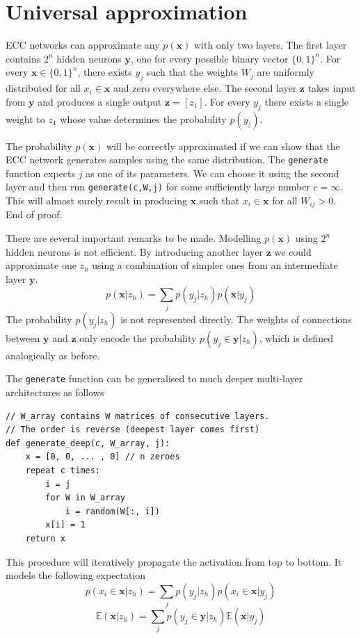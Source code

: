 \documentclass[12pt]{article}
\begin{document}
\section{Universal approximation}

ECC networks can approximate any $p(\boldsymbol{x})$ with only two layers. The first layer contains $2^n$ hidden neurons $\boldsymbol{y}$, one for every possible binary vector $\{0,1\}^n$. For every $\boldsymbol{x} \in \{0,1\}^n$, there exists $y_j$ such that the weights $W_j$ are uniformly distributed for all $x_i \in \boldsymbol{x}$ and zero everywhere else. The second layer $\boldsymbol{z}$ takes input from $\boldsymbol{y}$ and produces a single output $\boldsymbol{z}=[z_1]$. For every $y_j$ there exists a single weight to $z_1$ whose value determines the probability $p(y_j)$. 
 
The probability $p(\boldsymbol{x})$ will be correctly approximated if we can show that the ECC network generates samples using the same distribution. The \texttt{generate} function expects $j$ as one of its parameters. We can choose it using the second layer and then run \texttt{generate(c,W,j)} for some sufficiently large number $c=\infty$. This will almost surely result in producing  $\boldsymbol{x}$ such that $x_i\in \boldsymbol{x}$ for all $W_{ij}>0$. End of proof. 

There are several important remarks to be made. Modelling $p(\boldsymbol{x})$ using $2^n$ hidden neurons is not efficient. By introducing another layer $\boldsymbol{z}$ we could approximate one $z_h$ using a combination of  simpler ones from an intermediate layer $\boldsymbol{y}$.
\[
p(\boldsymbol{x}|z_h) = \sum_{j} p(y_j|z_h) p(\boldsymbol{x}|y_j)
\] 
The probability $p(y_j|z_h)$ is not represented directly. The weights of connections between $\boldsymbol{y}$ and $\boldsymbol{z}$ only encode the probability $p(y_j\in \boldsymbol{y}|z_h)$, which is defined analogically as before. 

The \texttt{generate} function can be generalised to much deeper multi-layer architectures as follows
\begin{lstlisting}
// W_array contains W matrices of consecutive layers.
// The order is reverse (deepest layer comes first)
def generate_deep(c, W_array, j):
    x = [0, 0, ... , 0] // n zeroes
    repeat c times:
        i = j
        for W in W_array
            i = random(W[:, i])
        x[i] = 1
    return x
\end{lstlisting}
This procedure will iteratively propagate the activation from top to bottom. It models the following expectation
\[
p(x_i\in \boldsymbol{x}|z_h) = \sum_{j} p(y_j|z_h) p(x_i \in \boldsymbol{x}|y_j)
\]
\[
\mathbb{E}(\boldsymbol{x}|z_h) = \sum_{j} p(y_j\in \boldsymbol{y}|z_h) \mathbb{E}(\boldsymbol{x}|y_j)
\] 
\end{document}
